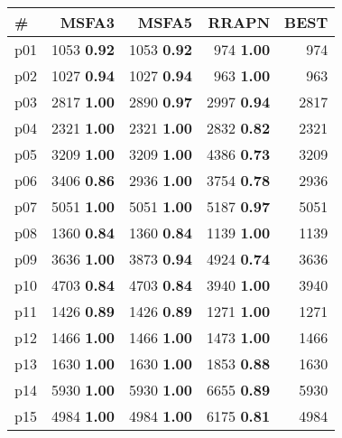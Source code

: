 \begin{tabular}{|l|rrr|r|}
\hline
\textbf{\#} & \textbf{MSFA3} & \textbf{MSFA5} & \textbf{RRAPN} & \textbf{BEST}\\
\hline
p01 & {\footnotesize 1053} \textbf{0.92} & {\footnotesize 1053} \textbf{0.92} & {\footnotesize 974} \textbf{1.00} & 974\\
p02 & {\footnotesize 1027} \textbf{0.94} & {\footnotesize 1027} \textbf{0.94} & {\footnotesize 963} \textbf{1.00} & 963\\
p03 & {\footnotesize 2817} \textbf{1.00} & {\footnotesize 2890} \textbf{0.97} & {\footnotesize 2997} \textbf{0.94} & 2817\\
p04 & {\footnotesize 2321} \textbf{1.00} & {\footnotesize 2321} \textbf{1.00} & {\footnotesize 2832} \textbf{0.82} & 2321\\
p05 & {\footnotesize 3209} \textbf{1.00} & {\footnotesize 3209} \textbf{1.00} & {\footnotesize 4386} \textbf{0.73} & 3209\\
p06 & {\footnotesize 3406} \textbf{0.86} & {\footnotesize 2936} \textbf{1.00} & {\footnotesize 3754} \textbf{0.78} & 2936\\
p07 & {\footnotesize 5051} \textbf{1.00} & {\footnotesize 5051} \textbf{1.00} & {\footnotesize 5187} \textbf{0.97} & 5051\\
p08 & {\footnotesize 1360} \textbf{0.84} & {\footnotesize 1360} \textbf{0.84} & {\footnotesize 1139} \textbf{1.00} & 1139\\
p09 & {\footnotesize 3636} \textbf{1.00} & {\footnotesize 3873} \textbf{0.94} & {\footnotesize 4924} \textbf{0.74} & 3636\\
p10 & {\footnotesize 4703} \textbf{0.84} & {\footnotesize 4703} \textbf{0.84} & {\footnotesize 3940} \textbf{1.00} & 3940\\
p11 & {\footnotesize 1426} \textbf{0.89} & {\footnotesize 1426} \textbf{0.89} & {\footnotesize 1271} \textbf{1.00} & 1271\\
p12 & {\footnotesize 1466} \textbf{1.00} & {\footnotesize 1466} \textbf{1.00} & {\footnotesize 1473} \textbf{1.00} & 1466\\
p13 & {\footnotesize 1630} \textbf{1.00} & {\footnotesize 1630} \textbf{1.00} & {\footnotesize 1853} \textbf{0.88} & 1630\\
p14 & {\footnotesize 5930} \textbf{1.00} & {\footnotesize 5930} \textbf{1.00} & {\footnotesize 6655} \textbf{0.89} & 5930\\
p15 & {\footnotesize 4984} \textbf{1.00} & {\footnotesize 4984} \textbf{1.00} & {\footnotesize 6175} \textbf{0.81} & 4984\\

\end{tabular}
